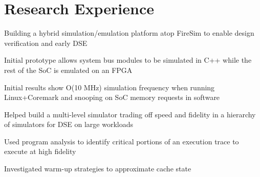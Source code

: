 \documentclass[]{deedy-resume-openfont}
\begin{document}
\section{Research Experience}



\vspace{\topsep} %

{\normalsize
\begin{tightemize}
\item Building a hybrid simulation/emulation platform atop FireSim to enable design verification and early DSE 
\item Initial prototype allows system bus modules to be simulated in C++ while the rest of the SoC is emulated on an FPGA
\item Initial results show O(10 MHz) simulation frequency when running Linux+Coremark and snooping on SoC memory requests in software 
\end{tightemize}
}

{\normalsize
\begin{tightemize}
\item Helped build a multi-level simulator trading off speed and fidelity in a hierarchy of simulators for DSE on large workloads
\item Used program analysis to identify critical portions of an execution trace to execute at high fidelity
\item Investigated warm-up strategies to approximate cache state 
\end{tightemize}
}


\end{document}
